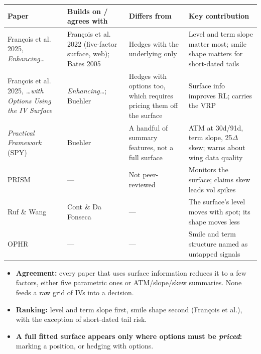 \documentclass{article}
\begin{document}
\begin{center}\small
\begin{tabularx}{\linewidth}{>{\raggedright\arraybackslash}X >{\raggedright\arraybackslash}X >{\raggedright\arraybackslash}X >{\raggedright\arraybackslash}X}
\toprule
\textbf{Paper} & \textbf{Builds on /\allowbreak{} agrees with} & \textbf{Differs from} & \textbf{Key contribution} \\
\midrule
François et al. 2025, \emph{Enhancing\ldots{}} & François et al. 2022 (five-factor surface, web); Bates 2005 & Hedges with the underlying only & Level and term slope matter most; smile shape matters for short-dated tails \\
François et al. 2025, \emph{\ldots{}with Options Using the IV Surface} & \emph{Enhancing\ldots{}}; Buehler & Hedges with options too, which requires pricing them off the surface & Surface info improves RL; carries the VRP \\
\emph{Practical Framework} (SPY) & Buehler & A handful of summary features, not a full surface & ATM at 30d/\allowbreak{}91d, term slope, 25\ensuremath{\Delta} skew; warns about wing data quality \\
PRISM & --- & Not peer-reviewed & Monitors the surface; claims skew leads vol spikes \\
Ruf \& Wang & Cont \& Da Fonseca & --- & The surface's level moves with spot; its shape moves less \\
OPHR & --- & --- & Smile and term structure named as untapped signals \\
\bottomrule
\end{tabularx}
\end{center}

\begin{itemize}

\item \textbf{Agreement:} every paper that uses surface information reduces it to a few factors, either five parametric ones or ATM/\allowbreak{}slope/\allowbreak{}skew summaries. None feeds a raw grid of IVs into a decision.

\item \textbf{Ranking:} level and term slope first, smile shape second (François et al.), with the exception of short-dated tail risk.

\item \textbf{A full fitted surface appears only where options must be \emph{priced}:} marking a position, or hedging with options.

\end{itemize}
\end{document}
